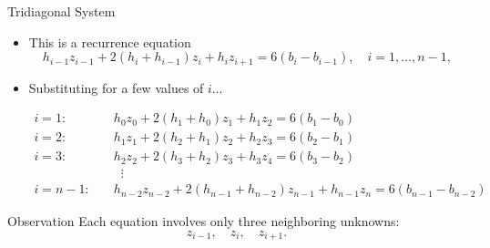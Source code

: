\documentclass[10pt]{beamer}
\begin{document}
\begin{frame}{Tridiagonal System}

\begin{itemize}
    \item This is a recurrence equation
\[
h_{i-1}z_{i-1} + 2(h_i+h_{i-1})z_i + h_i z_{i+1}
= 6(b_i - b_{i-1}), \quad i=1,\dots,n-1,
\]

\item Substituting for a few values of $i\dots$

\begin{align*}
i=1:\quad & h_0 z_0 + 2(h_1+h_0)z_1 + h_1 z_2 = 6(b_1 - b_0)\\
i=2:\quad & h_1 z_1 + 2(h_2+h_1)z_2 + h_2 z_3 = 6(b_2 - b_1)\\
i=3:\quad & h_2 z_2 + 2(h_3+h_2)z_3 + h_3 z_4 = 6(b_3 - b_2)\\
& \;\;\vdots\\
i=n-1:\quad & h_{n-2} z_{n-2} + 2(h_{n-1}+h_{n-2})z_{n-1} + h_{n-1} z_n
= 6(b_{n-1} - b_{n-2})
\end{align*}

\end{itemize}

\begin{block}{Observation}
Each equation involves only three neighboring unknowns:
\[
z_{i-1}, \quad z_i, \quad z_{i+1}.
\]
\end{block}


\end{frame}
\end{document}
